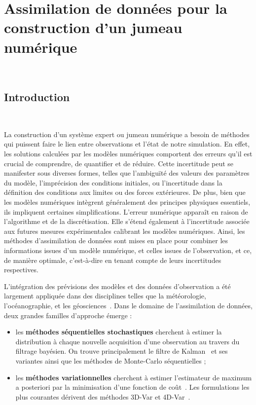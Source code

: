 
\chapter{Assimilation de données pour la construction d'un jumeau numérique}~\label{sec:da}

\section{Introduction}~\label{sec:intro_da}

La construction d'un système expert ou jumeau numérique a besoin de méthodes qui puissent faire le lien entre observations et l'état de notre simulation. En effet, les solutions calculées par les modèles numériques comportent des erreurs qu'il est crucial de comprendre, de quantifier et de réduire. Cette incertitude peut se manifester sous diverses formes, telles que l'ambiguïté des valeurs des paramètres du modèle, l'imprécision des conditions initiales, ou l'incertitude dans la définition des conditions aux limites ou des forces extérieures. De plus, bien que les modèles numériques intègrent généralement des principes physiques essentiels, ils impliquent certaines simplifications. L'erreur numérique apparaît en raison de l'algorithme et de la discrétisation. Elle s'étend également à l'incertitude associée aux futures mesures expérimentales calibrant les modèles numériques. Ainsi, les méthodes d'assimilation de données sont mises en place pour combiner les informations issues d'un modèle numérique, et celles issues de l'observation, et ce, de manière optimale, c'est-à-dire en tenant compte de leurs incertitudes respectives.

L'intégration des prévisions des modèles et des données d'observation a été largement appliquée dans des disciplines telles que la météorologie, l'océanographie, et les géosciences~\cite{bocquet_introduction_2014}. Dans le domaine de l'assimilation de données, deux grandes familles d'approche émerge :

\begin{itemize}
    \item les \textbf{méthodes séquentielles stochastiques} cherchent à estimer la distribution à chaque nouvelle acquisition d'une observation au travers du filtrage bayésien. On trouve principalement le filtre de Kalman~\cite{kalman_new_1960} et ses variantes ainsi que les méthodes de Monte-Carlo séquentielles ;
    \item les \textbf{méthodes variationnelles} cherchent à estimer l'estimateur de maximum a posteriori par la minimisation d'une fonction de coût~\cite{variational_method}. Les formulations les plus courantes dérivent des méthodes 3D-Var et 4D-Var~\cite{talagrand1997assimilation}.
\end{itemize}


